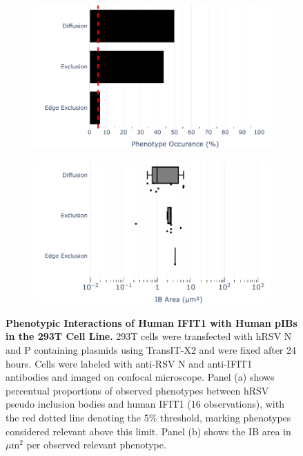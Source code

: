 \begin{figure}
    \begin{subfigure}{0.495\textwidth}
        \caption{}
        \includegraphics[width=1\linewidth]{09. Chapter 4/Figs/01. pIB/02. IFIT1/01. bar_i1_293t.pdf} 
    \end{subfigure}
    \begin{subfigure}{0.495\textwidth}
        \caption{}
        \includegraphics[width=1\linewidth]{09. Chapter 4/Figs/01. pIB/02. IFIT1/02. box_i1_293t.pdf}
    \end{subfigure}
    \caption[Phenotypic Interactions of Human IFIT1 with Human pIBs in the 293T Cell Line.]{\textbf{Phenotypic Interactions of Human IFIT1 with Human pIBs in the 293T Cell Line.} 293T cells were transfected with hRSV N and P containing plasmids using TransIT-X2 and were fixed after 24 hours. Cells were labeled with anti-RSV N and anti-IFIT1 antibodies and imaged on confocal microscope. Panel (a) shows percentual proportions of observed phenotypes between hRSV pseudo inclusion bodies and human IFIT1 (16 observations), with the red dotted line denoting the 5\% threshold, marking phenotypes considered relevant above this limit. Panel (b) shows the IB area in \(\mu \mbox{m}^2\) per observed relevant phenotype.}
    \label{fig:Phenotypic Interactions of Human IFIT1 with Human pIBs in the 293T Cell Line}
\end{figure}

